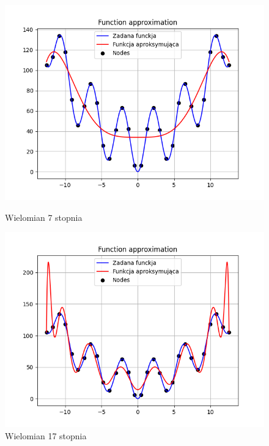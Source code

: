 \documentclass{article}
\begin{document}
\begin{figure}[H]
  \begin{minipage}[b]{0.49\textwidth}
    \begin{minipage}[b]{\textwidth}
      \includegraphics[width=\textwidth]{img10.png}
      \caption{Wielomian 7 stopnia}
    \end{minipage}
    \vspace*{\fill}
    \begin{minipage}[b]{\textwidth}
      \includegraphics[width=\textwidth]{img11.png}
      \caption{Wielomian 17 stopnia}
    \end{minipage}
  \end{minipage}
  \hfill
  \begin{minipage}[b]{0.49\textwidth}

\end{minipage}
\end{figure}
\end{document}
